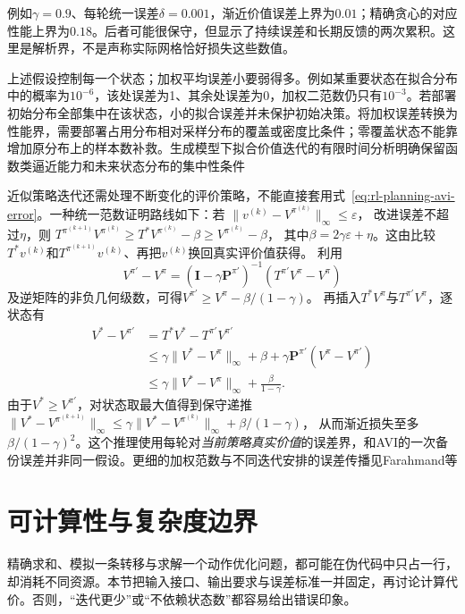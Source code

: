 例如$\gamma=0.9$、每轮统一误差$\delta=0.001$，渐近价值误差上界为$0.01$；精确贪心的对应性能上界为$0.18$。后者可能很保守，但显示了持续误差和长期反馈的两次累积。这里是解析界，不是声称实际网格恰好损失这些数值。

上述假设控制每一个状态；加权平均误差小要弱得多。例如某重要状态在拟合分布中的概率为$10^{-6}$，该处误差为1、其余处误差为0，加权二范数仍只有$10^{-3}$。若部署初始分布全部集中在该状态，小的拟合误差并未保护初始决策。将加权误差转换为性能界，需要部署占用分布相对采样分布的覆盖或密度比条件；零覆盖状态不能靠增加原分布上的样本数补救。生成模型下拟合价值迭代的有限时间分析明确保留函数类逼近能力和未来状态分布的集中性条件

近似策略迭代还需处理不断变化的评价策略，不能直接套用式~\eqref{eq:rl-planning-avi-error}。一种统一范数证明路线如下：若
$\lVert v^{(k)}-V^{\pi^{(k)}}\rVert_\infty\leq\varepsilon$，
改进误差不超过$\eta$，则
$T^{\pi^{(k+1)}}V^{\pi^{(k)}}\geq T^*V^{\pi^{(k)}}-\beta
\geq V^{\pi^{(k)}}-\beta$，
其中$\beta=2\gamma\varepsilon+\eta$。这由比较$T^*v^{(k)}$和$T^{\pi^{(k+1)}}v^{(k)}$、再把$v^{(k)}$换回真实评价值获得。
利用
\[
 V^{\pi'}-V^\pi
 =(\bm I-\gamma\bm P^{\pi'})^{-1}(T^{\pi'}V^\pi-V^\pi)
\]
及逆矩阵的非负几何级数，可得$V^{\pi'}\geq V^\pi-\beta/(1-\gamma)$。
再插入$T^*V^\pi$与$T^{\pi'}V^\pi$，逐状态有
\[
\begin{aligned}
 V^*-V^{\pi'}
 &=T^*V^*-T^{\pi'}V^{\pi'}\\
 &\leq\gamma\lVert V^*-V^\pi\rVert_\infty
       +\beta+\gamma\bm P^{\pi'}(V^\pi-V^{\pi'})\\
 &\leq\gamma\lVert V^*-V^\pi\rVert_\infty+\frac{\beta}{1-\gamma}.
\end{aligned}
\]
由于$V^*\geq V^{\pi'}$，对状态取最大值得到保守递推
$\lVert V^*-V^{\pi^{(k+1)}}\rVert_\infty
\leq\gamma\lVert V^*-V^{\pi^{(k)}}\rVert_\infty+\beta/(1-\gamma)$，
从而渐近损失至多$\beta/(1-\gamma)^2$。这个推理使用每轮对\emph{当前策略真实价值}的误差界，和AVI的一次备份误差并非同一假设。更细的加权范数与不同迭代安排的误差传播见Farahmand等

\section{可计算性与复杂度边界}
\label{sec:rl-planning-complexity}

精确求和、模拟一条转移与求解一个动作优化问题，都可能在伪代码中只占一行，却消耗不同资源。本节把输入接口、输出要求与误差标准一并固定，再讨论计算代价。否则，“迭代更少”或“不依赖状态数”都容易给出错误印象。

